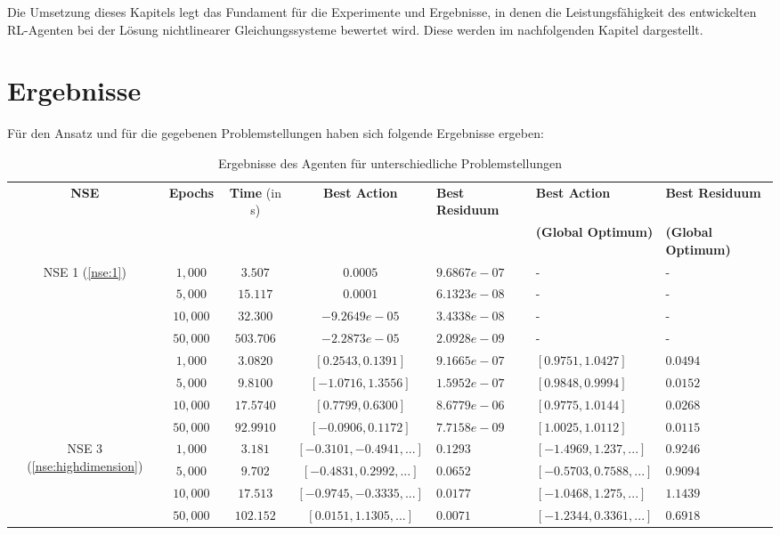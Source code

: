 \documentclass{article}
\theoremstyle{newline}
\begin{document}
\begin{onehalfspace}
Die Umsetzung dieses Kapitels legt das Fundament für die Experimente und Ergebnisse, in denen die Leistungsfähigkeit des entwickelten RL-Agenten bei der Lösung nichtlinearer Gleichungssysteme bewertet wird. Diese werden im nachfolgenden Kapitel dargestellt.

\section{Ergebnisse}

Für den Ansatz und für die gegebenen Problemstellungen haben sich folgende Ergebnisse ergeben:
\smallskip

\begin{table}[h]
	\centering
	
	\begin{tabular}{c||c|c|c|>{\centering\arraybackslash}p{2cm}|>{\centering\arraybackslash}p{3cm}|>{\centering\arraybackslash}p{2.5cm}}
		\textbf{NSE} & \textbf{Epochs} & \textbf{Time} (in s) & \textbf{Best Action} & \textbf{Best Residuum} & \textbf{Best Action} & \textbf{Best Residuum} \\
		& & & & & \textbf{(Global Optimum)} & \textbf{(Global Optimum)} \\
		\hline
		\multirow{5}{*}{NSE 1 (\ref{nse:1})} & $1,000$ & $3.507$ & $0.0005$ & $9.6867e-07$ & - & - \\
		& $5,000$ & $ 15.117$ & $0.0001$ & $6.1323e-08$ & - & - \\
		& $10,000$ & $32.300$ & $-9.2649e-05$ & $3.4338e-08$ & - & - \\
		& $50,000$ & $503.706$ & $-2.2873e-05$ & $2.0928e-09$ & - & - \\
		\hline
		\multirow{5}{*}{NSE 2 (\ref{nse:rosenbrock})} & $1,000$ & $3.0820$ & $[0.2543, 0.1391]$ & $9.1665e-07$ & $[0.9751, 1.0427]$ & $0.0494$ \\
		& $5,000$ & $9.8100$ & $[-1.0716, 1.3556]$ & $1.5952e-07$ & $[0.9848, 0.9994]$ & $0.0152$ \\
		& $10,000$ & $17.5740$ & $[0.7799, 0.6300]$ & $8.6779e-06$ & $[0.9775, 1.0144]$ & $0.0268$ \\
		& $50,000$ & $92.9910$ & $[-0.0906, 0.1172]$ & $7.7158e-09$ & $[1.0025, 1.0112]$ & $0.0115$ \\
		\hline
		\multirow{5}{*}{NSE 3 (\ref{nse:highdimension})} & $1,000$ & $3.181$ & $[-0.3101, -0.4941, ...]$ & $0.1293$ & $[-1.4969, 1.237, ...]$ & $0.9246$ \\
		& $5,000$ & $9.702$ & $[-0.4831, 0.2992, ...]$ & $0.0652$ & $[-0.5703, 0.7588, ...]$ & $0.9094$ \\
		& $10,000$ & $17.513$ & $[-0.9745, -0.3335, ...]$ & $0.0177$ & $[-1.0468, 1.275, ...]$ & $1.1439$ \\
		& $50,000$ & $102.152$ & $[0.0151, 1.1305, ...]$ & $0.0071$ & $[-1.2344, 0.3361, ...]$ & $0.6918$ \\
	\end{tabular}
		\caption{Ergebnisse des Agenten für unterschiedliche Problemstellungen}
		\label{tab:Ergebnisse}
\end{table}


\end{onehalfspace}
\end{document}
